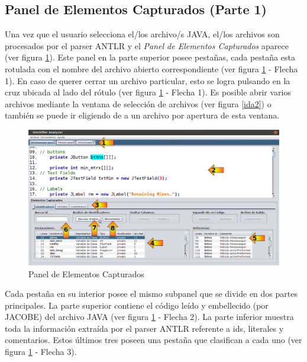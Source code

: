 \documentclass[a4paper,12pt]{report}
\begin{document}
\subsection{Panel de Elementos Capturados (Parte 1)}

Una vez que el usuario selecciona el/los archivo/s JAVA, 
el/los archivos son procesados por el parser ANTLR y el \textit{Panel de Elementos Capturados} aparece (ver figura \ref{ida3}). Este panel en la parte superior posee pestañas, cada pestaña esta rotulada con el nombre del archivo abierto correspondiente (ver figura \ref{ida3} - Flecha 1). En caso de querer cerrar un archivo particular, esto se logra pulsando en la cruz ubicada al lado del rótulo (ver figura \ref{ida3} - Flecha 1). Es posible abrir varios archivos mediante la ventana de selección de archivos (ver figura \ref{ida2}) o también se puede ir eligiendo de a un archivo por apertura de esta ventana. 

\begin{figure}[t] %
\centerline{%
\includegraphics[scale= 0.42]{./ida_03.png}
}
\caption{Panel de Elementos Capturados}
\label{ida3}
\end{figure}

Cada pestaña en su interior posee el mismo subpanel que se divide en dos partes principales. La parte superior contiene el código leído y embellecido (por JACOBE) del archivo JAVA (ver figura \ref{ida3} - Flecha 2).
La parte inferior muestra toda la información extraída por el parser ANTLR referente a ids, literales y comentarios. Estos últimos tres poseen una pestaña que clasifican a cada uno (ver figura \ref{ida3} - Flecha 3). 
\end{document}
